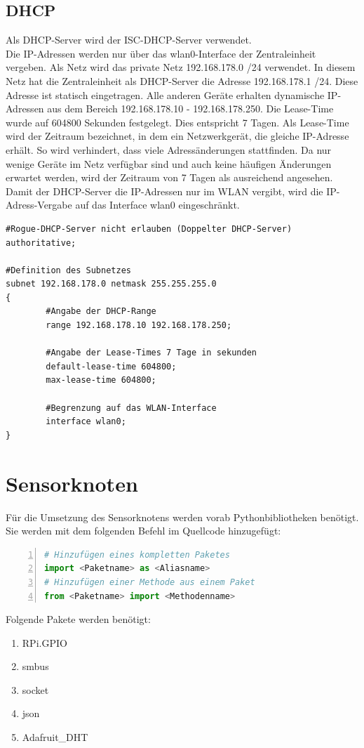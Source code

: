 \subsection{\ac{DHCP}}
 
Als \ac{DHCP}-Server wird der ISC-DHCP-Server verwendet.\\
Die IP-Adressen werden nur über das wlan0-Interface der Zentraleinheit vergeben. Als Netz wird das private Netz 192.168.178.0 /24 verwendet. In diesem Netz hat die Zentraleinheit als \ac{DHCP}-Server die Adresse 192.168.178.1 /24. Diese Adresse ist statisch eingetragen. Alle anderen Geräte erhalten dynamische IP-Adressen aus dem Bereich 192.168.178.10 - 192.168.178.250. Die Lease-Time wurde auf 604800 Sekunden festgelegt. Dies entspricht 7 Tagen. Als Lease-Time wird der Zeitraum bezeichnet, in dem ein Netzwerkgerät, die gleiche IP-Adresse erhält. So wird verhindert, dass viele Adressänderungen stattfinden. Da nur wenige Geräte im Netz verfügbar sind und auch keine häufigen Änderungen erwartet werden, wird der Zeitraum von 7 Tagen als ausreichend angesehen. Damit der \ac{DHCP}-Server die IP-Adressen nur im WLAN vergibt, wird die IP-Adress-Vergabe auf das Interface wlan0 eingeschränkt.



\begin{lstlisting}[caption=Konfiguration des ISC-DHCP-Server,frame=single,label=dhcpkonfig]
#Rogue-DHCP-Server nicht erlauben (Doppelter DHCP-Server)
authoritative;

#Definition des Subnetzes
subnet 192.168.178.0 netmask 255.255.255.0
{
        #Angabe der DHCP-Range
        range 192.168.178.10 192.168.178.250;

        #Angabe der Lease-Times 7 Tage in sekunden
        default-lease-time 604800;
        max-lease-time 604800;

        #Begrenzung auf das WLAN-Interface
        interface wlan0;
}

\end{lstlisting}

\section{Sensorknoten} %
Für die Umsetzung des Sensorknotens werden vorab Pythonbibliotheken benötigt. Sie werden mit dem folgenden Befehl im Quellcode hinzugefügt:
\begin{lstlisting}[caption=Importbefehl in Python,frame=single,numbers=left,language=Python]
# Hinzufügen eines kompletten Paketes
import <Paketname> as <Aliasname>
# Hinzufügen einer Methode aus einem Paket
from <Paketname> import <Methodenname>
\end{lstlisting}
Folgende Pakete werden benötigt:
\begin{enumerate}
	\item RPi.GPIO
	\item smbus
	\item socket
	\item json
	\item Adafruit\_DHT
\end{enumerate}

